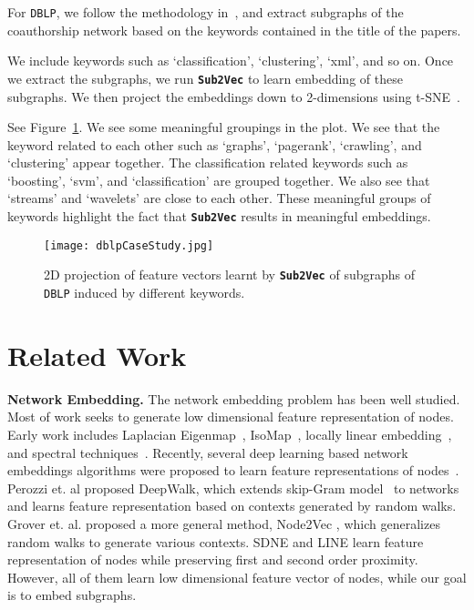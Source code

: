 \documentclass[sigconf]{acmart}
\newcommand{\alg}{{\bf {\tt Sub2Vec}}\xspace}
\newcommand{\dblp}{{\tt DBLP}\xspace}
\begin{document}
For \dblp, we follow the methodology in~\cite{lappas2010finding}, and extract subgraphs of the coauthorship network based on the keywords contained in the title of the papers. 

We include keywords such as `classification', `clustering', `xml', and so on. Once we extract the subgraphs, we run \alg to learn embedding of these subgraphs. We then project the embeddings down to 2-dimensions using t-SNE~\cite{maaten2008visualizing}. 

 
See Figure~\ref{fig:casedblp}. We see some meaningful groupings in the plot. We see that the keyword related to each other such as  `graphs', `pagerank', `crawling',  and `clustering' appear together. The classification related keywords such as `boosting', `svm', and `classification' are grouped together. We also see that `streams' and `wavelets' are close to each other. These meaningful groups of keywords highlight the fact that \alg results in meaningful embeddings. 



\begin{figure}[htb]
	\texttt{[image: dblpCaseStudy.jpg]}
		\vspace{-0.2in}
	\caption{2D projection of feature vectors learnt by \alg of subgraphs of \dblp induced by different keywords. }
	\label{fig:casedblp}
	\vspace{-0.2in}
\end{figure} 

\section{Related Work}
\label{sec:related}
\noindent \textbf{Network Embedding.}
The network embedding problem has been well studied. Most of work seeks to generate  low dimensional feature representation of nodes. Early work includes Laplacian Eigenmap~\cite{belkin2001laplacian}, IsoMap~\cite{tenenbaum2000global}, locally linear embedding~\cite{roweis2000nonlinear}, and spectral techniques~\cite{bach2003learning, chung1997spectral}.
Recently, several deep learning based network embeddings algorithms were proposed to learn feature representations of nodes~\cite{perozzi2014deepwalk, wang2016structural, tang2015line, grover2016node2vec}.
 Perozzi et. al \cite{perozzi2014deepwalk} proposed DeepWalk, which extends skip-Gram model~\cite{mikolov2013distributed} to networks and learns feature representation based on contexts generated by random walks. 
 Grover et. al. proposed a more general method, Node2Vec \cite{grover2016node2vec}, which generalizes random walks to generate various contexts. SDNE \cite{wang2016structural} and LINE \cite{tang2015line} learn feature representation of nodes while preserving first and second order proximity. However, all of them learn low dimensional feature vector of nodes, while our goal is to embed subgraphs.
\end{document}
